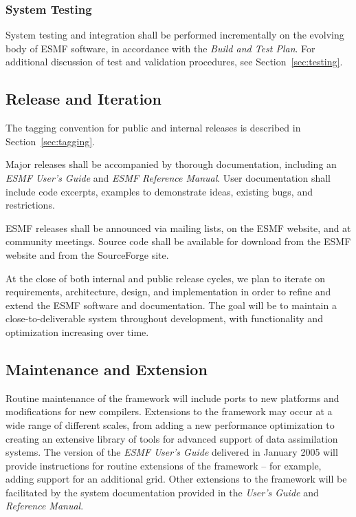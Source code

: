 \subsubsection {System Testing }

System testing and integration shall be performed incrementally on the 
evolving body of ESMF software, in accordance with the {\it Build and Test 
Plan}.  For additional discussion
of test and validation procedures, see Section~\ref{sec:testing}.

\subsection {Release and Iteration }

The tagging convention for public and internal releases is
described in Section~\ref{sec:tagging}.

Major releases shall be accompanied by thorough documentation, including an 
{\it ESMF User's Guide} and {\it ESMF Reference Manual}.  User documentation
shall include code excerpts, examples to demonstrate ideas, existing bugs,
and restrictions. 

ESMF releases shall be announced via mailing lists, on the ESMF
website, and at community meetings.  Source code shall be available
for download from the ESMF website and from the SourceForge site.

At the close of both internal and public release cycles, we plan to 
iterate on requirements, architecture, design, and implementation in 
order to refine and extend the ESMF software and documentation.  The
goal will be to maintain a close-to-deliverable system throughout 
development, with functionality and optimization increasing
over time.

\subsection {Maintenance and Extension} 

Routine maintenance of the framework will include ports to new 
platforms and modifications for new compilers.  Extensions to the 
framework may occur at a wide range of different scales, from adding
a new performance optimization to creating an extensive library
of tools for advanced support of data assimilation systems.  
The version of the {\it ESMF User's Guide} delivered in 
January 2005 will provide instructions for routine extensions of 
the framework -- for example, adding support for an additional grid.
Other extensions to the framework will be facilitated by the system
documentation provided in the {\it User's Guide} and {\it Reference Manual}.  











